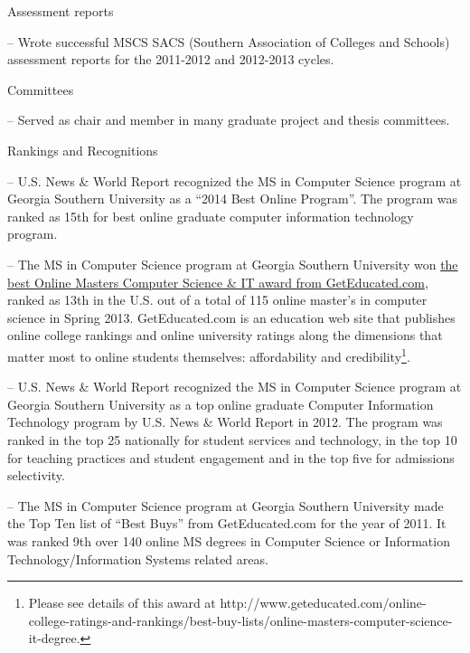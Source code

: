 \documentclass[10pt]{article}
\begin{document}
\begin{outerlist}
\item Assessment reports
\begin{innerlist}
\item[--] Wrote successful MSCS SACS (Southern Association of Colleges and Schools) assessment reports for the 2011-2012 and 2012-2013 cycles. 
\end{innerlist}

\item Committees
\begin{innerlist}
\item[--] Served as chair and member in many graduate project and thesis committees.
\end{innerlist}

\item Rankings and Recognitions
\begin{innerlist}
\item[--] U.S. News \& World Report recognized the MS in Computer Science program at Georgia Southern University as a ``2014 Best Online Program''.  The program was ranked as 15th for best online graduate computer information technology program.

\item[--] The MS in Computer Science program at Georgia Southern University won \href{http://www.geteducated.com/online-college-ratings-and-rankings/best-buy-lists/online-masters-computer-science-it-degree}{the best Online Masters Computer Science \& IT award from GetEducated.com}, ranked as 13th in the U.S. out of a total of 115 online master's in computer science in Spring 2013. GetEducated.com is an education web site that publishes online college rankings and online university ratings along the dimensions that matter most to online students themselves: affordability and credibility\footnote{ Please see details of this award at http://www.geteducated.com/online-college-ratings-and-rankings/best-buy-lists/online-masters-computer-science-it-degree.}. 

\item[--] U.S. News \& World Report recognized the MS in Computer Science program at Georgia Southern University as a top online graduate Computer Information Technology program by U.S. News \& World Report in 2012.  The program was ranked in the top 25 nationally for student services and technology, in the top 10 for teaching practices and student engagement and in the top five for admissions selectivity. 

\item[--] The MS in Computer Science program at Georgia Southern University made the Top Ten list of ``Best Buys'' from GetEducated.com for the year of 2011. It was ranked 9th over 140 online MS degrees in Computer Science or Information Technology/Information Systems related areas. 
\end{innerlist}

\end{outerlist}
\end{document}
